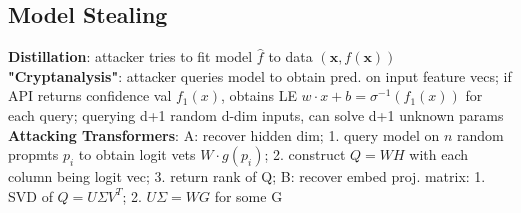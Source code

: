 \subsection{Model Stealing}
\textbf{Distillation}: attacker tries to fit model $\hat{f}$ to data $(\mathbf{x}, f(\mathbf{x}))$\\
\textbf{"Cryptanalysis"}: attacker queries model to obtain pred. on input feature vecs; if API returns confidence val $f_1(x)$, obtains LE $w\cdot x + b= \sigma^{-1}(f_1(x))$ for each query; querying d+1 random d-dim inputs, can solve d+1 unknown params\\
\textbf{Attacking Transformers}: A: recover hidden dim; 1. query model on $n$ random propmts $p_i$ to obtain logit vets $W\cdot g(p_i)$; 2. construct $Q = WH$ with each column being logit vec; 3. return rank of Q; B: recover embed proj. matrix: 1. SVD of $Q=U\Sigma V^T$; 2. $U\Sigma=WG$ for some G
